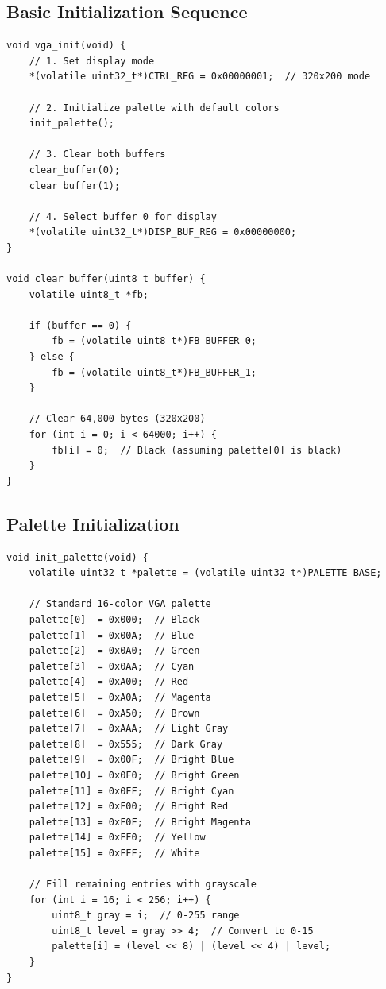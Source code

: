 \documentclass[11pt,letterpaper]{report}
\begin{document}
\subsection{Basic Initialization Sequence}

\begin{lstlisting}[style=c,caption={VGA Controller Initialization}]
void vga_init(void) {
    // 1. Set display mode
    *(volatile uint32_t*)CTRL_REG = 0x00000001;  // 320x200 mode
    
    // 2. Initialize palette with default colors
    init_palette();
    
    // 3. Clear both buffers
    clear_buffer(0);
    clear_buffer(1);
    
    // 4. Select buffer 0 for display
    *(volatile uint32_t*)DISP_BUF_REG = 0x00000000;
}

void clear_buffer(uint8_t buffer) {
    volatile uint8_t *fb;
    
    if (buffer == 0) {
        fb = (volatile uint8_t*)FB_BUFFER_0;
    } else {
        fb = (volatile uint8_t*)FB_BUFFER_1;
    }
    
    // Clear 64,000 bytes (320x200)
    for (int i = 0; i < 64000; i++) {
        fb[i] = 0;  // Black (assuming palette[0] is black)
    }
}
\end{lstlisting}

\subsection{Palette Initialization}

\begin{lstlisting}[style=c,caption={Standard VGA Palette Initialization}]
void init_palette(void) {
    volatile uint32_t *palette = (volatile uint32_t*)PALETTE_BASE;
    
    // Standard 16-color VGA palette
    palette[0]  = 0x000;  // Black
    palette[1]  = 0x00A;  // Blue
    palette[2]  = 0x0A0;  // Green
    palette[3]  = 0x0AA;  // Cyan
    palette[4]  = 0xA00;  // Red
    palette[5]  = 0xA0A;  // Magenta
    palette[6]  = 0xA50;  // Brown
    palette[7]  = 0xAAA;  // Light Gray
    palette[8]  = 0x555;  // Dark Gray
    palette[9]  = 0x00F;  // Bright Blue
    palette[10] = 0x0F0;  // Bright Green
    palette[11] = 0x0FF;  // Bright Cyan
    palette[12] = 0xF00;  // Bright Red
    palette[13] = 0xF0F;  // Bright Magenta
    palette[14] = 0xFF0;  // Yellow
    palette[15] = 0xFFF;  // White
    
    // Fill remaining entries with grayscale
    for (int i = 16; i < 256; i++) {
        uint8_t gray = i;  // 0-255 range
        uint8_t level = gray >> 4;  // Convert to 0-15
        palette[i] = (level << 8) | (level << 4) | level;
    }
}
\end{lstlisting}
\end{document}
